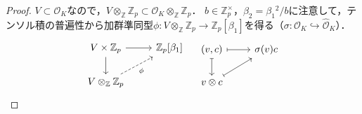 \begin{proof}
  $V \subset \mathcal{O}_K$なので，$V \otimes_\mathbb{Z} \mathbb{Z}_p \subset \mathcal{O}_K \otimes_\mathbb{Z} \mathbb{Z}_p$．
  $b \in \mathbb{Z}_p^\times$，$\beta_2 = \beta_1{}^2/b$に注意して，テンソル積の普遍性から加群準同型$\phi \colon V \otimes_\mathbb{Z} \mathbb{Z}_p \to \mathbb{Z}_p[\beta_1]$を得る（$\sigma \colon \mathcal{O}_K \hookrightarrow \widehat{\mathcal{O}}_K$）．
  \[
  \begin{tikzcd}
    V \times \mathbb{Z}_p \arrow[r]\arrow[d] & \mathbb{Z}_p[\beta_1] \\
    V \otimes_\mathbb{Z} \mathbb{Z}_p \arrow[ur, "\phi"', dashed]
  \end{tikzcd}
  \quad
  \begin{tikzcd}
    (v, c) \arrow[r, mapsto]\arrow[d, mapsto] & \sigma(v)c \\
    v \otimes c \arrow[ur, mapsto]
  \end{tikzcd}
  \]

\end{proof}
